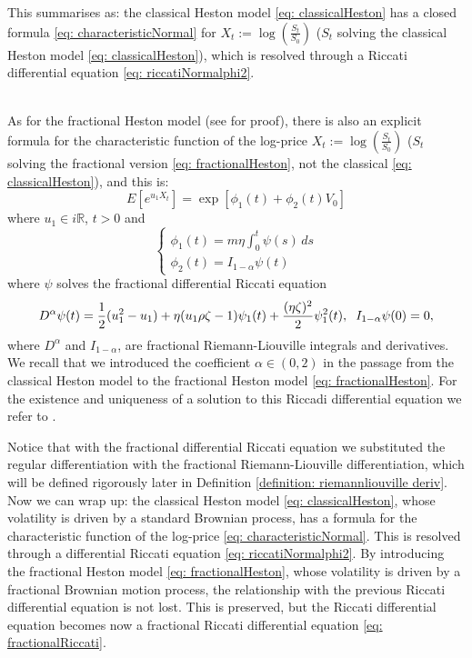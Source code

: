 \documentclass[a4paper,italian,11pt]{book}
\theoremstyle{plain}
\theoremstyle{remark}
\theoremstyle{plain}
\begin{document}
This summarises as: the classical Heston model \eqref{eq: classicalHeston} has a closed formula \eqref{eq: characteristicNormal} for $X_t := \log(\frac{S_t}{S_0}) $ ($S_t$ solving the classical Heston model \eqref{eq: classicalHeston}), which is resolved through a Riccati differential equation \eqref{eq: riccatiNormalphi2}.
\\\

As for the fractional Heston model (see \cite{Omar} for proof), there is also an explicit formula for the characteristic function of the log-price $X_t:= \log(\frac{S_t}{S_0})$ ($S_t$ solving the fractional version \eqref{eq: fractionalHeston}, not the classical \eqref{eq: classicalHeston}), and this is:
\begin{equation}
    \label{eq: firstSolForHestonModel}
    E[e^{u_1X_t}] = \exp[\phi_1(t) + \phi_2(t)V_0]
\end{equation}
where $u_1\in i\mathbb{R}$, $t>0$ and
\begin{equation}
    \label{eq: phisofHestonFract}
    \begin{cases}
    \phi_1(t)= m \eta \int_0^t \psi(s)\, ds \\
    \phi_2(t) = I_{1-\alpha} \psi(t)
    \end{cases}
\end{equation}
where $\psi$ solves the fractional differential Riccati equation 
\begin{equation}
    \label{eq: fractionalRiccati}
    D^\alpha \psi(t) = \frac{1}{2}(u_1^2-u_1) + \eta (u_1 \rho \zeta-1) \psi_1(t)  +\frac{(\eta \zeta)^2}{2}\psi_1^2(t), \hspace{0.2cm} I_{1-\alpha}\psi(0)=0,
\end{equation}
where $D^\alpha$ and $I_{1-\alpha}$, are fractional Riemann-Liouville integrals and derivatives. We recall that we introduced the coefficient $\alpha \in (0,2)$ in the passage from the classical Heston model to the fractional Heston model \eqref{eq: fractionalHeston}. For the existence and uniqueness of a solution to this Riccadi differential equation we refer to \cite{Omar}.

Notice that with the fractional differential Riccati equation we substituted the regular differentiation with the fractional Riemann-Liouville differentiation, which will be defined rigorously later in Definition \ref{definition: riemannliouville deriv}.
\\

Now we can wrap up: the classical Heston model \eqref{eq: classicalHeston}, whose volatility is driven by a standard Brownian process, has a formula for the characteristic function of the log-price \eqref{eq: characteristicNormal}. 
This is resolved through a differential Riccati equation \eqref{eq: riccatiNormalphi2}. 
By introducing the fractional Heston model \eqref{eq: fractionalHeston}, whose volatility is driven by a fractional Brownian motion process, the relationship with the previous Riccati differential equation is not lost. 
This is preserved, but the Riccati differential equation becomes now a fractional Riccati differential equation \eqref{eq: fractionalRiccati}.
\\\
\\
\end{document}

